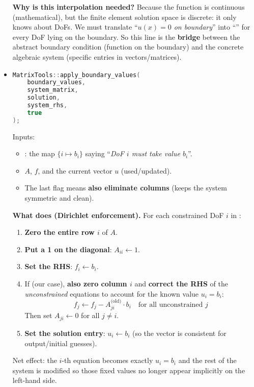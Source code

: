 \begin{itemize}
    \textcolor{Green3}{ \textbf{Why is this interpolation needed?}} Because the function is continuous (mathematical), but the finite element solution space is discrete: it only knows about DoFs. We must translate ``\emph{$u(x)=0$ on boundary}'' into ``'' for every DoF lying on the boundary. So this line is the \textbf{bridge} between the abstract boundary condition (function on the boundary) and the concrete algebraic system (specific entries in vectors/matrices).


    \item {}
    \begin{lstlisting}[language=C++]
MatrixTools::apply_boundary_values(
    boundary_values,
    system_matrix,
    solution,
    system_rhs,
    true
);\end{lstlisting}
    Inputs:
    \begin{itemize}
        \item {}: the map $\{ i \mapsto b_i \}$ saying ``\emph{DoF $i$ must take value $b_i$}''.
        \item {} $A$,  $f$, and the current  vector $u$ (used/updated).
        \item The last flag  means \textbf{also eliminate columns} (keeps the system symmetric and clean).
    \end{itemize}

    \textcolor{Green3}{ \textbf{What  does (Dirichlet enforcement).}} For each constrained DoF $i$ in :
    \begin{enumerate}
        \item \textbf{Zero the entire row $i$} of $A$.
        \item \textbf{Put a 1 on the diagonal}: $A_{ii} \leftarrow 1$.
        \item \textbf{Set the RHS}: $f_{i} \leftarrow b_{i}$.
        \item If  (our case), \textbf{also zero column $i$} and \textbf{correct the RHS} of the \emph{unconstrained} equations to account for the known value $u_{i} = b_{i}$:
        \begin{equation*}
            f_j \leftarrow f_j - A_{j i}^{\text{(old)}} \cdot b_i \quad \text{for all unconstrained } j
        \end{equation*}
        Then set $A_{j i} \leftarrow 0$ for all $j \neq i$.
        \item \textbf{Set the solution entry}: $u_{i} \leftarrow b_{i}$ (so the vector is consistent for output/initial guesses).
    \end{enumerate}
    Net effect: the $i$-th equation becomes exactly $u_{i} = b_{i}$ and the rest of the system is modified so those fixed values no longer appear implicitly on the left-hand side.
    

\end{itemize}
